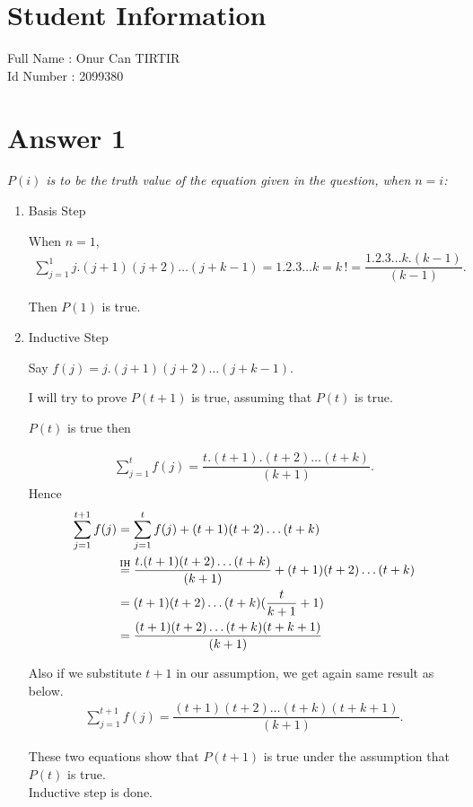 \documentclass[12pt]{article}
\begin{document}
\section*{Student Information } 
Full Name :  Onur Can TIRTIR\\
Id Number :  2099380

\section*{Answer 1}

\textit{$P(i)$ is to be the truth value of the equation given in the question, when $n=i$:}

\begin{enumerate}

\item Basis Step
	
When $n=1$,
\begin{align*} \sum_{j=1}^{1} j.(j+1)(j+2)\dots (j+k-1)=1.2.3\dots k=k\, !=\dfrac{1.2.3\dots k.(k-1)}{(k-1)}.\end{align*}

Then $P(1)$ is true.

\item Inductive Step

Say $f(j)=j.(j+1)(j+2)\dots (j+k-1)$.

I will try to prove $P(t+1)$ is true, assuming that $P(t)$ is true.

$P(t)$ is true then

\begin{align*} \sum_{j=1}^{t} f(j)=\dfrac{t.(t+1).(t+2)\dots (t+k)}{(k+1)}.\end{align*}
Hence
\begin{equation*}
\begin{split}
	\sum_{j=1}^{t+1} f(j) & = \sum_{j=1}^{t}f(j)+(t+1)(t+2)\dots(t+k)\\
						  & \stackrel{\mathmakebox[\widthof{=}]{\mathrm{IH}}}{=} \dfrac{t.(t+1)(t+2)\dots (t+k)}{(k+1)} + (t+1)(t+2)\dots (t+k)\\
						  & = (t+1)(t+2)\dots (t+k)(\dfrac{t}{k+1}+1)\\
						  & = \dfrac{(t+1)(t+2)\dots (t+k)(t+k+1)}{(k+1)}
\end{split}
\end{equation*}

Also if we substitute $t+1$ in our assumption, we get again same result as below.\\
\begin{align} \sum_{j=1}^{t+1} f(j)=\dfrac{(t+1)(t+2)\dots (t+k)(t+k+1)}{(k+1)}.\end{align}

These two equations show that $P(t+1)$ is true under the assumption that $P(t)$ is true.\\Inductive step is done.

\end{enumerate}
\end{document}
